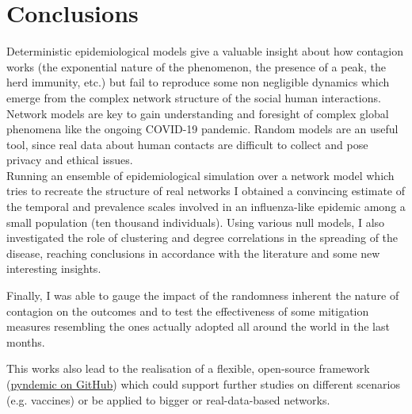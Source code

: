 \documentclass[DIV=12, BCOR=0pt]{scrartcl}  %
\begin{document}
	
	
	\section{Conclusions}
	Deterministic epidemiological models give a valuable insight about how contagion works (the exponential nature of the phenomenon, the presence of a peak, the herd immunity, etc.) but fail to reproduce some non negligible dynamics which emerge from the complex network structure of the social human interactions. Network models are key to gain understanding and foresight of complex global phenomena like the ongoing COVID-19 pandemic. Random models are an useful tool, since real data about human contacts are difficult to collect and pose privacy and ethical issues.\\
	
	Running an ensemble of epidemiological simulation over a network model which tries to recreate the structure of real networks \citep{Holme} I obtained a convincing estimate of the temporal and prevalence scales involved in an influenza-like epidemic among a small population (ten thousand individuals). 
	Using various null models, I also investigated the role of clustering and degree correlations in the spreading of the disease, reaching conclusions in accordance with the literature and some new interesting insights.
	
	Finally, I was able to gauge the impact of the randomness inherent the nature of contagion on the outcomes and to test the effectiveness of some mitigation measures resembling the ones actually adopted all around the world in the last months.
	
	This works also lead to the realisation of a flexible, open-source framework
  (\href{https://github.com/giacom0rovers1/pyndemic}{pyndemic on GitHub})
	 which could support further studies on different scenarios (e.g. vaccines) or be applied to bigger or real-data-based networks.
	
%


 
%		
	\clearpage
	\small
	
\end{document}
